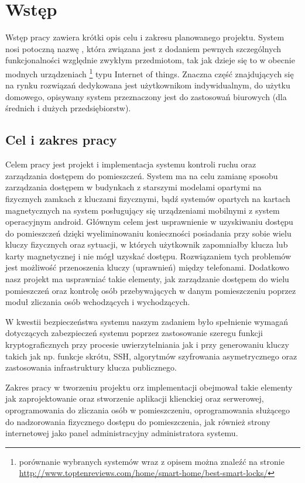 \newpage\section{Wstęp}\label{sec:wstep}
Wstęp pracy zawiera krótki opis celu i zakresu planowanego projektu. System nosi potoczną nazwę \NazwaSys, która związana jest z dodaniem  pewnych szczególnych funkcjonalności względnie zwykłym przedmiotom, tak jak dzieje się to w obecnie modnych urządzeniach \footnote{ porównanie wybranych systemów wraz z opisem można znaleźć na stronie \href{http://www.toptenreviews.com/home/smart-home/best-smart-locks/}{http://www.toptenreviews.com/home/smart-home/best-smart-locks/}} typu Internet of things. Znaczna część znajdujących się na rynku rozwiązań dedykowana jest użytkownikom indywidualnym, do użytku domowego, opisywany system przeznaczony jest do zastosowań biurowych (dla średnich i dużych przedsiębiorstw).

\subsection{Cel i zakres pracy}

Celem pracy jest projekt i implementacja systemu kontroli ruchu oraz zarządzania dostępem do pomieszczeń. System ma na celu zamianę sposobu zarządzania dostępem w budynkach z starszymi modelami opartymi na fizycznych zamkach z kluczami fizycznymi, bądź systemów opartych na kartach magnetycznych na system posługujący się urządzeniami mobilnymi z system operacyjnym android. Głównym celem jest usprawnienie w uzyskiwaniu dostępu do pomieszczeń dzięki wyeliminowaniu konieczności posiadania przy sobie wielu kluczy fizycznych oraz sytuacji, w których użytkownik zapomniałby klucza lub karty magnetycznej i nie mógł uzyskać dostępu. Rozwiązaniem tych problemów jest możliwość przenoszenia kluczy (uprawnień) między telefonami. Dodatkowo nasz projekt ma usprawniać takie elementy, jak zarządzanie dostępem do wielu pomieszczeń oraz kontrolę osób przebywających w danym pomieszczeniu poprzez moduł zliczania osób wchodzących i wychodzących.
	
W kwestii bezpieczeństwa systemu naszym zadaniem było spełnienie wymagań dotyczących zabezpieczeń systemu poprzez zastosowanie szeregu funkcji kryptograficznych przy procesie uwierzytelniania jak i przy generowaniu kluczy takich jak np. funkcje skrótu, SSH, algorytmów szyfrowania asymetrycznego oraz zastosowania infrastruktury klucza publicznego.

Zakres pracy w tworzeniu projektu orz implementacji obejmował takie elementy jak zaprojektowanie oraz stworzenie aplikacji klienckiej oraz serwerowej, oprogramowania do zliczania osób w pomieszczeniu, oprogramowania służącego do nadzorowania fizycznego dostępu do pomieszczenia, jak również strony internetowej jako panel administracyjny administratora systemu.

